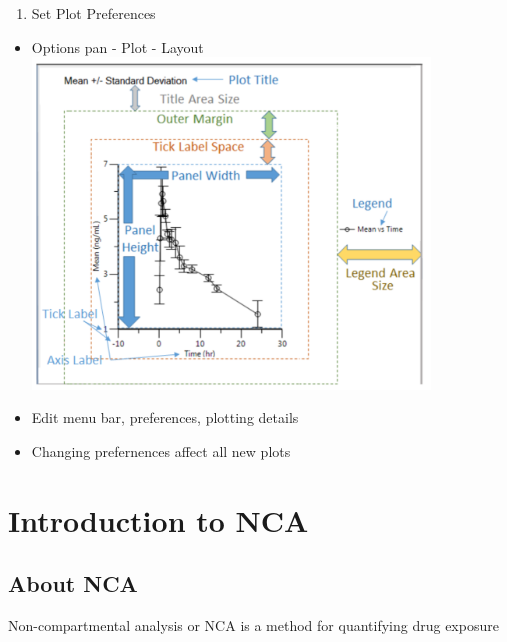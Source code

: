 \documentclass[
  letterpaper,
  DIV=11,
  numbers=noendperiod]{scrreprt}
\providecommand{\tightlist}{%
  \setlength{\itemsep}{0pt}\setlength{\parskip}{0pt}}\usepackage{longtable,booktabs,array}
\begin{document}
\begin{enumerate}
\def\labelenumi{\arabic{enumi}.}
\setcounter{enumi}{8}
\tightlist
\item
  Set Plot Preferences
\end{enumerate}

\begin{itemize}
\tightlist
\item
  Options pan - Plot - Layout
  \includegraphics[width=4.15625in,height=\textheight]{./images/image-1684060613.png}
\item
  Edit menu bar, preferences, plotting details
\item
  Changing prefernences affect all new plots
\end{itemize}

\hypertarget{introduction-to-nca}{%
\section{Introduction to NCA}\label{introduction-to-nca}}

\hypertarget{about-nca}{%
\subsection{About NCA}\label{about-nca}}

Non-compartmental analysis or NCA is a method for quantifying drug
exposure
\end{document}
